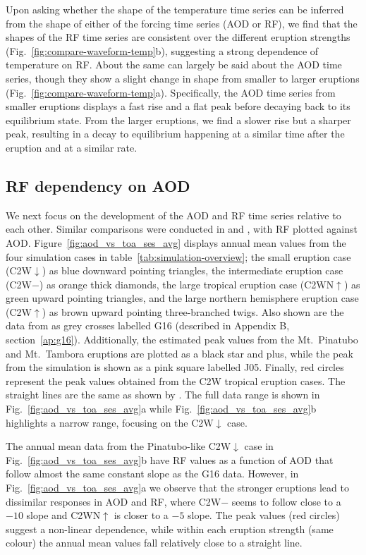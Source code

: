 \documentclass[draft]{agujournal2019}
\newcommand{\cwmp}{C2W\(-\)}
\newcommand{\cwm}{C2W\(\downarrow\)}
\newcommand{\cws}{C2WN\(\uparrow\)}
\newcommand{\cwsn}{C2W\(\uparrow\)}
\begin{document}
Upon asking whether the shape of the temperature time series can be inferred from the
shape of either of the forcing time series (AOD or RF), we find that the shapes of the
RF time series are consistent over the different eruption strengths
(Fig.~\ref{fig:compare-waveform-temp}b), suggesting a strong dependence of temperature
on RF. About the same can largely be said about the AOD time series, though they show a
slight change in shape from smaller to larger eruptions
(Fig.~\ref{fig:compare-waveform-temp}a). Specifically, the AOD time series from smaller
eruptions displays a fast rise and a flat peak before decaying back to its equilibrium
state. From the larger eruptions, we find a slower rise but a sharper peak, resulting in
a decay to equilibrium happening at a similar time after the eruption and at a similar
rate.

\subsection{RF dependency on AOD}

We next focus on the development of the AOD and RF time series relative to each other.
Similar comparisons were conducted in  and
, with RF plotted against AOD.
Figure~\ref{fig:aod_vs_toa_ses_avg} displays annual mean values from the four simulation
cases in table~\ref{tab:simulation-overview}; the small eruption case (\cwm{}) as blue
downward pointing triangles, the intermediate eruption case (\cwmp{}) as orange thick
diamonds, the large tropical eruption case (\cws{}) as green upward pointing triangles,
and the large northern hemisphere eruption case (\cwsn{}) as brown upward pointing
three-branched twigs. Also shown are the data from  as grey crosses labelled G16 (described in Appendix B,
section~\ref{ap:g16}). Additionally, the estimated peak values from the Mt.\ Pinatubo
and Mt.\ Tambora eruptions are plotted as a black star and plus, while the peak from the
 simulation is shown as a pink square labelled J05. Finally, red
circles represent the peak values obtained from the C2W tropical eruption cases. The
straight lines are the same as shown by . The full data range is
shown in Fig.~\ref{fig:aod_vs_toa_ses_avg}a while Fig.~\ref{fig:aod_vs_toa_ses_avg}b
highlights a narrow range, focusing on the \cwm{} case.

The annual mean data from the Pinatubo-like \cwm{} case in
Fig.~\ref{fig:aod_vs_toa_ses_avg}b have RF values as a function of AOD that follow
almost the same constant slope as the G16 data. However, in
Fig.~\ref{fig:aod_vs_toa_ses_avg}a we observe that the stronger eruptions lead to
dissimilar responses in AOD and RF, where \cwmp{} seems to follow close to a \(-10\)
slope and \cws{} is closer to a \(-5\) slope. The peak values (red circles) suggest a
non-linear dependence, while within each eruption strength (same colour) the annual mean
values fall relatively close to a straight line.
\end{document}

